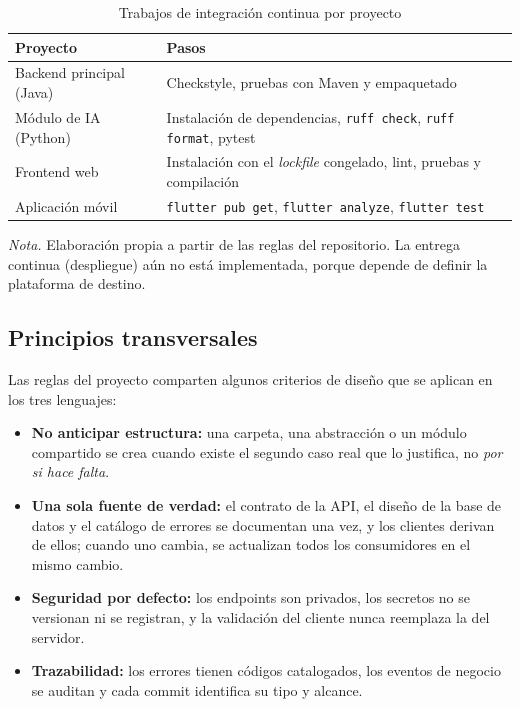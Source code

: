 \begin{table}[H]
\caption{Trabajos de integración continua por proyecto}
\label{tab:estandar_ci}
\begin{threeparttable}
\begin{tabular}{>{\raggedright\arraybackslash}p{4.0cm} >{\raggedright\arraybackslash}p{8.8cm}}
\toprule
Proyecto & Pasos \\
\midrule
Backend principal (Java) & Checkstyle, pruebas con Maven y empaquetado \\
Módulo de IA (Python) & Instalación de dependencias, \texttt{ruff check}, \texttt{ruff format}, pytest \\
Frontend web & Instalación con el \textit{lockfile} congelado, lint, pruebas y compilación \\
Aplicación móvil & \texttt{flutter pub get}, \texttt{flutter analyze}, \texttt{flutter test} \\
\bottomrule
\end{tabular}
\begin{tablenotes}
\item \textit{Nota.} Elaboración propia a partir de las reglas del repositorio. La entrega continua (despliegue) aún no está implementada, porque depende de definir la plataforma de destino.
\end{tablenotes}
\end{threeparttable}
\end{table}

\subsection{Principios transversales}

Las reglas del proyecto comparten algunos criterios de diseño que se aplican en los tres lenguajes:

\begin{itemize}
    \item \textbf{No anticipar estructura:} una carpeta, una abstracción o un módulo compartido se crea cuando existe el segundo caso real que lo justifica, no \textit{por si hace falta}.
    \item \textbf{Una sola fuente de verdad:} el contrato de la API, el diseño de la base de datos y el catálogo de errores se documentan una vez, y los clientes derivan de ellos; cuando uno cambia, se actualizan todos los consumidores en el mismo cambio.
    \item \textbf{Seguridad por defecto:} los endpoints son privados, los secretos no se versionan ni se registran, y la validación del cliente nunca reemplaza la del servidor.
    \item \textbf{Trazabilidad:} los errores tienen códigos catalogados, los eventos de negocio se auditan y cada commit identifica su tipo y alcance.
\end{itemize}

